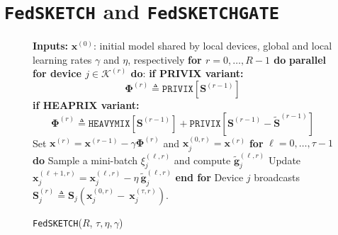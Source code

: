 \documentclass[11pt]{article}
\newcommand\DrawBoxhom[3][]{%
  \begin{tikzpicture}[remember picture,overlay]
    \draw[overlay,fill=gray!30,#1] 
    ([xshift=-0.5em,yshift=-0.1ex]{pic cs:#2}) 
    rectangle 
    ([xshift=35pt,yshift=3.1ex]pic cs:#3);
  \end{tikzpicture}%
}
\newcommand\DrawBoxxhom[3][]{%
  \begin{tikzpicture}[remember picture,overlay]
    \draw[overlay,fill=gray!30,#1] 
    ([xshift=-5.9em,yshift=-1.1ex]{pic cs:#2}) 
    rectangle 
    ([xshift=80pt,yshift=-1.5ex]pic cs:#3);
  \end{tikzpicture}%
}
\begin{document}
\vspace{-0.05in}
\section{\texttt{FedSKETCH} and \texttt{FedSKETCHGATE}}\label{sec:algos}
\vspace{-0.05in}

\begin{figure}\vspace{-0.4in}
\begin{minipage}{\linewidth}
\begin{algorithm}[H]
\caption{\texttt{FedSKETCH}($R$, $\tau, \eta, \gamma$) }\label{Alg:PFLHom}
\begin{algorithmic}[1]
\STATE \textbf{Inputs:} $\boldsymbol{x}^{(0)}$: initial  model shared by local devices, global and local learning rates $\gamma$ and $\eta$, respectively
\STATE \textbf{for $r=0, \ldots, R-1$ do}
\STATE \textbf{parallel for device $j\in \mathcal{K}^{(r)}$ do}:
\STATE \hspace{0.02in} \textbf{if PRIVIX variant:} 
{\small $${\mathbf{\Phi}}^{(r)}\triangleq  {\texttt{PRIVIX}}\left[{\mathbf{S}}^{(r-1)}\right]$$}
\STATE \hspace{0.02in} \textbf{if HEAPRIX variant:} \label{line:heaprix1}
{\small $${\mathbf{\Phi}}^{(r)}\triangleq \texttt{HEAVYMIX}\left[{\mathbf{S}}^{(r-1)}\right]+\texttt{PRIVIX}\left[{\mathbf{S}}^{(r-1)}- \tilde{\mathbf{S}}^{(r-1)}\right]$$}
\STATE Set $\boldsymbol{x}^{(r)}=\boldsymbol{x}^{(r-1)}-\gamma{\mathbf{\Phi}}^{(r)}$ and $\boldsymbol{x}_j^{(0,r)}=\boldsymbol{x}^{(r)}$ 
\STATE \hspace{0.01in} \textbf{for} $\ell=0,\ldots,\tau-1$ \textbf{do}
\STATE \hspace{0.03in} Sample a mini-batch $\xi_j^{(\ell,r)}$ and compute $\tilde{\mathbf{g}}_{j}^{(\ell,r)}$
\STATE Update $\boldsymbol{x}^{(\ell+1,r)}_{j}=\boldsymbol{x}^{(\ell,r)}_j-\eta~ \tilde{\mathbf{g}}_{j}^{(\ell,r)}$ \label{eq:update-rule-alg}
\STATE \hspace{0.05in}\textbf{end for}
\STATE Device $j$ broadcasts $\mathbf{S}^{(r)}_{j}\triangleq\mathbf{S}_{j}\left(\boldsymbol{x}_j^{(0,r)}-~{\boldsymbol{x}}_{j}^{(\tau,r)}\right)$.

\end{algorithmic}
\end{algorithm}
\end{minipage}
\end{figure}
\end{document}
